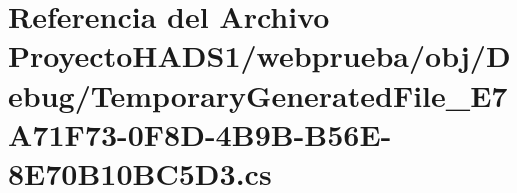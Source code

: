 \hypertarget{_proyecto_h_a_d_s1_2webprueba_2obj_2_debug_2_temporary_generated_file___e7_a71_f73-0_f8_d-4_b9_b-_b56_e-8_e70_b10_b_c5_d3_8cs}{}\section{Referencia del Archivo Proyecto\+H\+A\+D\+S1/webprueba/obj/\+Debug/\+Temporary\+Generated\+File\+\_\+\+E7\+A71\+F73-\/0\+F8\+D-\/4\+B9\+B-\/\+B56\+E-\/8\+E70\+B10\+B\+C5\+D3.cs}
\label{_proyecto_h_a_d_s1_2webprueba_2obj_2_debug_2_temporary_generated_file___e7_a71_f73-0_f8_d-4_b9_b-_b56_e-8_e70_b10_b_c5_d3_8cs}
